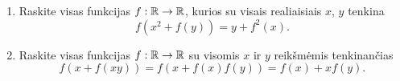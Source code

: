 \begin{enumerate}
  \item \text{[IMO 1992]} Raskite visas funkcijas $f:\mathbb R\to\mathbb R$, kurios su
    visais realiaisiais $x$, $y$ tenkina $$f(x^2 + f(y)) = y + f^2(x).$$
  \item Raskite visas funkcijas $f:\mathbb R \to \mathbb R$ su visomis $x$ ir $y$
    reikšmėmis tenkinančias $$f(x +f(xy))=f(x+f(x)f(y))=f(x)+xf(y).$$

\end{enumerate}
